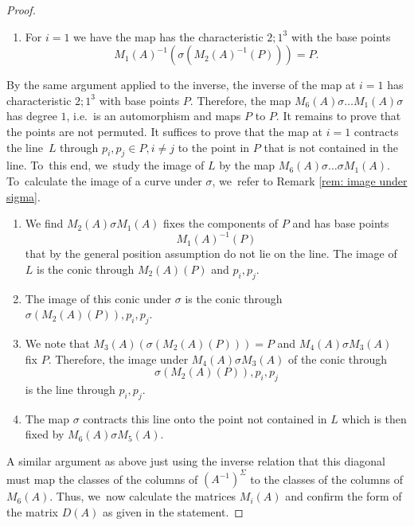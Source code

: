 \documentclass[10pt,a4paper]{amsart}
\newcommand{\ie}{i.e.\ }
\theoremstyle{definition}
\begin{document}
\begin{proof}
\begin{enumerate}
\[
M_2(A)^{-1}(\sigma(M_3(A)^{-1}(P))) = P
\]
of multiplicity $2$.
\item For $i = 1$ we have the map has the characteristic $2;1^3$ with the base points
\[
M_1(A)^{-1}(\sigma(M_2(A)^{-1}(P))) = P.
\]
\end{enumerate}
By the same argument applied to the inverse, the inverse of the map at $i = 1$ has characteristic $2;1^3$ with base points $P$. Therefore, the map $M_6(A) \sigma \dots M_1(A) \sigma$ has degree $1$, \ie is an automorphism and maps $P$ to $P$. It remains to prove that the points are not permuted. It suffices to prove that the map at $i = 1$ contracts the line~$L$ through $p_i, p_j \in P, i \neq j$ to the point in $P$ that is not contained in the line. To~this end, we~study the image of $L$ by the map $M_6(A) \sigma \dots \sigma M_1(A)$. To~calculate the image of a curve under $\sigma$, we~refer to Remark \ref{rem: image under sigma}.
\begin{enumerate}
\item We find $M_2(A) \sigma M_1(A)$ fixes the components of $P$ and has base points
\[
M_1(A)^{-1}(P)
\]
that by the general position assumption do not lie on the line. The image of $L$ is the conic through $M_2(A)(P)$ and $p_i,p_j$.
\item The image of this conic under $\sigma$ is the conic through $\sigma(M_2(A)(P)), p_i, p_j$.
\item We note that $M_3(A)(\sigma(M_2(A)(P))) = P$ and $M_4(A) \sigma M_3(A)$ fix $P$. Therefore, the image under $M_4(A) \sigma M_3(A)$ of the conic through
\[
\sigma(M_2(A)(P)), p_i, p_j
\]
is the line through $p_i,p_j$.
\item The map $\sigma$ contracts this line onto the point not contained in $L$ which is then fixed by $M_6(A) \sigma M_5(A)$.
\end{enumerate}

A similar argument as above just using the inverse relation that this diagonal must map the classes of the columns of $(A^{-1})^{\Sigma}$ to the classes of the columns of $M_6(A)$. Thus, we~now calculate the matrices $M_i(A)$ and confirm the form of the matrix $D(A)$ as given in the statement.


\end{proof}
\end{document}
